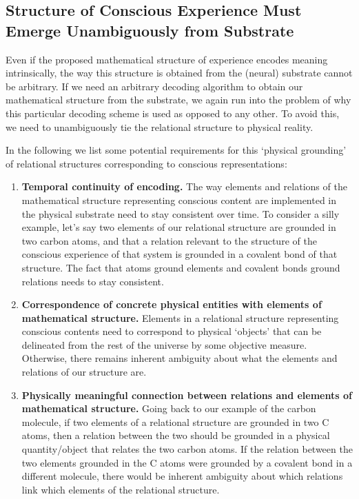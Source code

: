 \documentclass[11pt]{article}
\begin{document}
\subsection{Structure of Conscious Experience Must Emerge Unambiguously from Substrate}

Even if the proposed mathematical structure of experience encodes meaning intrinsically, the way this structure is obtained from the (neural) substrate cannot be arbitrary. If we need an arbitrary decoding algorithm to obtain our mathematical structure from the substrate, we again run into the problem of why this particular decoding scheme is used as opposed to any other. To avoid this, we need to unambiguously tie the relational structure to physical reality.

In the following we list some potential requirements for this `physical grounding' of relational structures corresponding to conscious representations:

\begin{enumerate}
\item \textbf{Temporal continuity of encoding.} The way elements and relations of the mathematical structure representing conscious content are implemented in the physical substrate need to stay consistent over time. To consider a silly example, let's say two elements of our relational structure are grounded in two carbon atoms, and that a relation relevant to the structure of the conscious experience of that system is grounded in a covalent bond of that structure. The fact that atoms ground elements and covalent bonds ground relations needs to stay consistent.

\item \textbf{Correspondence of concrete physical entities with elements of mathematical structure.} Elements in a relational structure representing conscious contents need to correspond to physical `objects' that can be delineated from the rest of the universe by some objective measure. Otherwise, there remains inherent ambiguity about what the elements and relations of our structure are.

\item \textbf{Physically meaningful connection between relations and elements of mathematical structure.} Going back to our example of the carbon molecule, if two elements of a relational structure are grounded in two C atoms, then a relation between the two should be grounded in a physical quantity/object that relates the two carbon atoms. If the relation between the two elements grounded in the C atoms were grounded by a covalent bond in a different molecule, there would be inherent ambiguity about which relations link which elements of the relational structure.
\end{enumerate}
\end{document}
